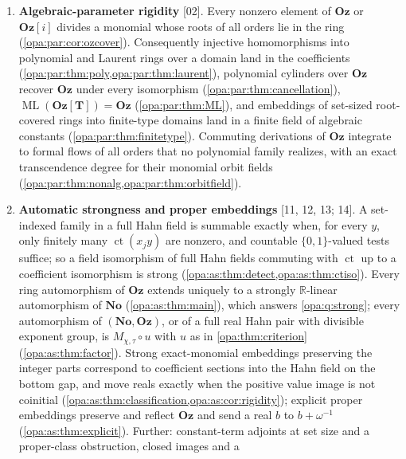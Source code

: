 \documentclass[11pt,oneside]{article}
\numberwithin{equation}{section}
\theoremstyle{definition}
\theoremstyle{remark}
\newcommand{\No}{\mathbf{No}}
\newcommand{\Oz}{\mathbf{Oz}}
\newcommand{\Og}{\mathbf{Oz}[i]}
\newcommand{\R}{\mathbb R}
\newcommand{\Q}{\mathbb Q}
\newcommand{\ct}{\operatorname{ct}}
\newcommand{\ML}{\operatorname{ML}}
\newcommand{\src}[1]{\textup{\textsf{\small[#1]}}}
\begin{document}
\begin{enumerate}[label=\textup{(\arabic*)},leftmargin=*,itemsep=3pt]
for $\Og$; real shears commute with conjugation, and 10's two-term witnesses
also preserve the order of the real axis and the projections
(\cref{opa:sc:prop:complex}); an imaginary-time shear
fixing any set moves the real axis inside the leading-term kernel
(\cref{opa:thm:realaxis}); a wild coefficient lift moves an ordinary real
(\cref{opa:prop:wild}); and the common fixed field of all automorphisms
preserving $\Og$ is $\Q$ (\cref{opa:cor:gaussianfixed}).
\item \textbf{Algebraic-parameter rigidity} \src{02}. Every nonzero element
of $\Oz$ or $\Og$ divides a monomial whose roots of all orders lie in the
ring (\cref{opa:par:cor:ozcover}). Consequently injective homomorphisms into
polynomial and Laurent rings over a domain land in the coefficients
(\cref{opa:par:thm:poly,opa:par:thm:laurent}), polynomial cylinders over
$\Oz$ recover $\Oz$ under every isomorphism
(\cref{opa:par:thm:cancellation}), $\ML(\Oz[\mathbf T])=\Oz$
(\cref{opa:par:thm:ML}), and embeddings of set-sized root-covered rings into
finite-type domains land in a finite field of algebraic constants
(\cref{opa:par:thm:finitetype}). Commuting derivations of $\Oz$ integrate to
formal flows of all orders that no polynomial family realizes, with an exact
transcendence degree for their monomial orbit fields
(\cref{opa:par:thm:nonalg,opa:par:thm:orbitfield}).
\item \textbf{Automatic strongness and proper embeddings} \src{11, 12, 13; 14}. A
set-indexed family in a full Hahn field is summable exactly when, for every
$y$, only finitely many $\ct(x_jy)$ are nonzero, and countable $\{0,1\}$-valued
tests suffice; so a field isomorphism of full Hahn fields commuting with $\ct$
up to a coefficient isomorphism is strong
(\cref{opa:as:thm:detect,opa:as:thm:ctiso}). Every ring automorphism of $\Oz$
extends uniquely to a strongly $\R$-linear automorphism of $\No$
(\cref{opa:as:thm:main}), which answers \cref{opa:q:strong}; every automorphism
of $(\No,\Oz)$, or of a full real Hahn pair with divisible exponent group, is
$M_{\chi,\tau}\circ u$ with $u$ as in \cref{opa:thm:criterion}
(\cref{opa:as:thm:factor}). Strong exact-monomial embeddings preserving the
integer parts correspond to coefficient sections into the Hahn field on the
bottom gap, and move reals exactly when the positive value image is not
coinitial (\cref{opa:as:thm:classification,opa:as:cor:rigidity}); explicit
proper embeddings preserve and reflect $\Oz$ and send a real $b$ to
$b+\omega^{-1}$ (\cref{opa:as:thm:explicit}). Further: constant-term adjoints
at set size and a proper-class obstruction, closed images and a

\end{enumerate}
\end{document}
